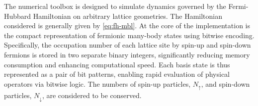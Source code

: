 



















The numerical toolbox is designed to simulate dynamics governed by the Fermi-Hubbard Hamiltonian on arbitrary lattice geometries. The Hamiltonian considered is generally given by \eqref{eq:fh-mbl}. At the core of the implementation is the compact representation of fermionic many-body states using bitwise encoding. Specifically, the occupation number of each lattice site by spin-up and spin-down fermions is stored in two separate binary integers, significantly reducing memory consumption and enhancing computational speed. Each basis state is thus represented as a pair of bit patterns, enabling rapid evaluation of physical operators via bitwise logic. The numbers of spin-up particles, $N_\uparrow$, and spin-down particles, $N_\downarrow$, are considered to be conserved.


